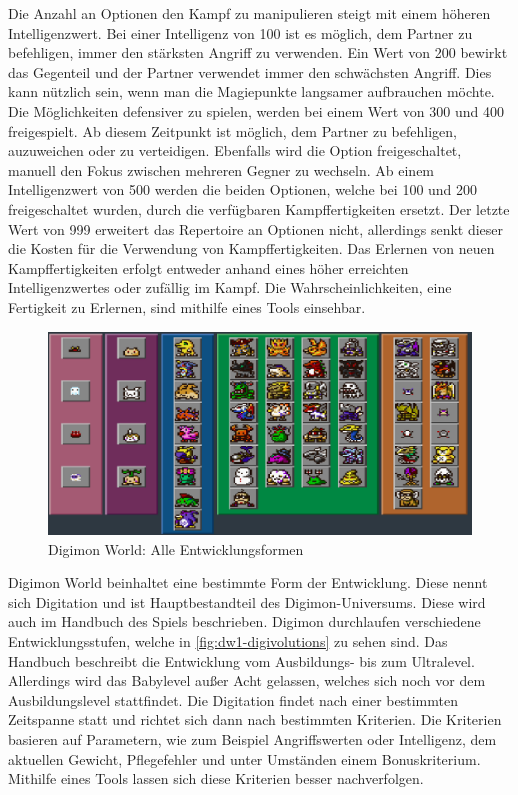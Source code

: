 Die Anzahl an Optionen den Kampf zu manipulieren steigt mit einem höheren Intelligenzwert.
Bei einer Intelligenz von 100 ist es möglich, dem Partner zu befehligen, immer den stärksten Angriff zu verwenden.
Ein Wert von 200 bewirkt das Gegenteil und der Partner verwendet immer den schwächsten Angriff.
Dies kann nützlich sein, wenn man die Magiepunkte langsamer aufbrauchen möchte.
Die Möglichkeiten defensiver zu spielen, werden bei einem Wert von 300 und 400 freigespielt.
Ab diesem Zeitpunkt ist möglich, dem Partner zu befehligen, auzuweichen oder zu verteidigen.
Ebenfalls wird die Option freigeschaltet, manuell den Fokus zwischen mehreren Gegner zu wechseln.
Ab einem Intelligenzwert von 500 werden die beiden Optionen, welche bei 100 und 200 freigeschaltet wurden, durch die verfügbaren Kampffertigkeiten ersetzt.
Der letzte Wert von 999 erweitert das Repertoire an Optionen nicht, allerdings senkt dieser die Kosten für die Verwendung von Kampffertigkeiten.
Das Erlernen von neuen Kampffertigkeiten erfolgt entweder anhand eines höher erreichten Intelligenzwertes oder zufällig im Kampf.
Die Wahrscheinlichkeiten, eine Fertigkeit zu Erlernen, sind mithilfe eines Tools einsehbar\cite{move-tool}. \\

\begin{figure}[H]
  \begin{center}
    \includegraphics[width=1\columnwidth]{figures/screenshots/digivolutions.png}
    \caption{\label{fig:dw1-digivolutions} Digimon World: Alle Entwicklungsformen}
  \end{center}
\end{figure}

Digimon World beinhaltet eine bestimmte Form der Entwicklung.
Diese nennt sich Digitation und ist Hauptbestandteil des Digimon-Universums.
Diese wird auch im Handbuch des Spiels beschrieben.
Digimon durchlaufen verschiedene Entwicklungsstufen, welche in \autoref{fig:dw1-digivolutions} zu sehen sind.
Das Handbuch beschreibt die Entwicklung vom Ausbildungs- bis zum Ultralevel.
Allerdings wird das Babylevel außer Acht gelassen, welches sich noch vor dem Ausbildungslevel stattfindet.
Die Digitation findet nach einer bestimmten Zeitspanne statt und richtet sich dann nach bestimmten Kriterien.
Die Kriterien basieren auf Parametern, wie zum Beispiel Angriffswerten oder Intelligenz, dem aktuellen Gewicht, Pflegefehler und unter Umständen einem Bonuskriterium.
Mithilfe eines Tools lassen sich diese Kriterien besser nachverfolgen\cite{digivolution}. \\

